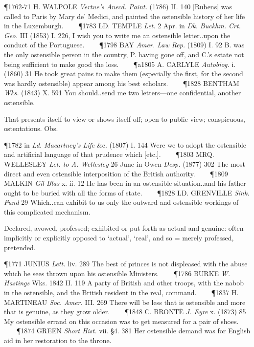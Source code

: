 \begin{description}[wide, labelwidth=!, labelindent=0pt]
\begin{myenumerate}
\P 1762-71 H. WALPOLE  \textit{Vertue's Anecd. Paint.} (1786) II. 140 [Rubens] was called to Paris by Mary de' Medici, and painted the ostensible history of her life in the Luxemburgh.    
\P 1783 LD. TEMPLE  \textit{Let.} 2 Apr. in \textit{Dk. Buckhm. Crt. Geo.} III (1853) I. 226, I wish you to write me an ostensible letter..upon the conduct of the Portuguese.    
\P 1798 BAY  \textit{Amer. Law Rep.} (1809) I. 92 B. was the only ostensible person in the country, P. having gone off, and C.'s estate not being sufficient to make good the loss.    
\P a1805 A. CARLYLE  \textit{Autobiog.} i. (1860) 31 He took great pains to make them (especially the first, for the second was hardly ostensible) appear among his best scholars.    
\P 1828 BENTHAM  \textit{Wks.} (1843) X. 591 You should..send me two letters—one confidential, another ostensible.

 That presents itself to view or shows itself off; open to public view; conspicuous, ostentatious. Obs.

\P 1782 in  \textit{Ld. Macartney's Life} \&c. (1807) I. 144 Were we to adopt the ostensible and artificial language of that prudence which [etc.].    
\P 1803 MRQ.  WELLESLEY \textit{Let. to A. Wellesley} 26 June in Owen \textit{Desp.} (1877) 302 The most direct and even ostensible interposition of the British authority.    
\P 1809 MALKIN  \textit{Gil Blas} x. ii. 12 He has been in an ostensible situation..and his father ought to be buried with all the forms of state.    
\P 1828 LD. GRENVILLE  \textit{Sink. Fund} 29 Which..can exhibit to us only the outward and ostensible workings of this complicated mechanism.

 Declared, avowed, professed; exhibited or put forth as actual and genuine: often implicitly or explicitly opposed to ‘actual’, ‘real’, and so = merely professed, pretended.

\P 1771 JUNIUS  \textit{Lett.} liv. 289 The best of princes is not displeased with the abuse which he sees thrown upon his ostensible Ministers.    
\P 1786 BURKE  \textit{W. Hastings} Wks. 1842 II. 119  A party of British and other troops, with the nabob in the ostensible, and the British resident in the real, command.    
\P 1837 H. MARTINEAU  \textit{Soc. Amer.} III. 269 There will be less that is ostensible and more that is genuine, as they grow older.    
\P 1848 C. BRONTË  \textit{J. Eyre} x. (1873) 85 My ostensible errand on this occasion was to get measured for a pair of shoes.    
\P 1874 GREEN  \textit{Short Hist.} vii. §4. 381 Her ostensible demand was for English aid in her restoration to the throne.


\end{myenumerate}
\end{description}
